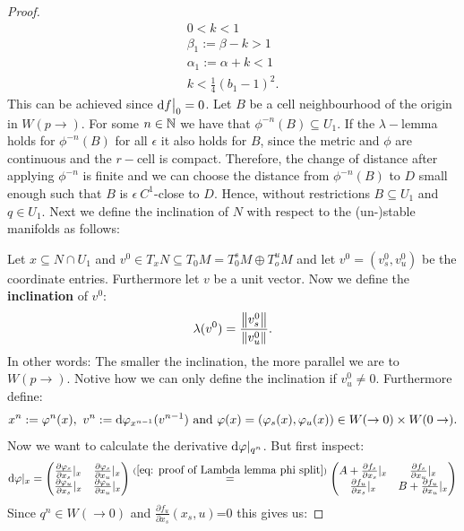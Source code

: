 \begin{proof}
		
		\begin{gather*}
			0<k<1 \\
			\beta_1:=\beta -k >1 \\
			\alpha_1:=\alpha +k <1 \\
			k<\frac{1}{4}(b_1-1)^2.
		\end{gather*}
		This can be achieved since $\mathop{}\!\mathrm{d} f\big|_0=0$.
		Let $B$ be a cell neighbourhood of the origin in $W(p\to )$. For some $n \in \mathbb{N}$ we have that $\phi^{-n}(B)\subseteq U_1$. If the $\lambda-$lemma holds for $\phi^{-n}(B)$ for all $\epsilon$ it also holds for $B$, since the metric and $\phi$ are continuous and the $r-$cell is compact. Therefore, the change of distance after applying $\phi^{-n}$ is finite and we can choose the distance from $\phi^{-n}(B)$ to $D$ small enough such that $B$ is $\epsilon~C^1$-close to $D$. Hence, without restrictions $B\subseteq U_1$ and $q\in U_1$.  Next we define the inclination of $N$ with respect to the (un-)stable manifolds as follows: 
		
		Let $x\subseteq N \cap U_1$ and $v^0\in T_xN\subseteq T_0M=T^s_0M \oplus T^u_oM$ and let $v^0=(v_s^0,v_u^0)$ be the coordinate entries. Furthermore let $v$ be a unit vector. Now we define the \textbf{inclination} of $v^0$:
		\begin{align*}
			\lambda(v^0)=\frac{\left\lVert v^0_s\right\rVert}{\left\lVert v^0_u\right\rVert}.
		\end{align*}
		In other words: The smaller the inclination, the more parallel we are to $W(p\to)$. Notive how we can only define the inclination if $v^0_u\neq 0$. 
		Furthermore define:
		\begin{align*} x^n:=\varphi^n(x), ~v^n:= \mathop{}\!\mathrm{d} \varphi_{x^{n-1}}(v^{n-1}) \text{ and } \varphi(x)=(\varphi_s(x),\varphi_u(x))\in W(\to 0)\times W(0\to).
		\end{align*}
		Now we want to calculate the derivative $\mathop{}\!\mathrm{d} \varphi|_{q^n}$. But first inspect:
		\begin{align*}
			\mathop{}\!\mathrm{d} \varphi|_x=\begin{pmatrix}
				\frac{\partial \varphi_s}{\partial x_s}|_{x} & \frac{\partial \varphi_s}{\partial x_u} |_{x}\\
				\frac{\partial \varphi_u}{\partial x_s} |_{x}& \frac{\partial \varphi_u}{\partial x_u}|_{x}
			\end{pmatrix}\overset{(\ref{eq: proof of Lambda lemma phi split}) }{~=~}
			\begin{pmatrix}
				A+ \frac{\partial f_s}{\partial x_s}|_{x}& \frac{\partial f_s}{\partial x_u}|_{x}\\
				\frac{\partial f_u}{\partial x_s} |_{x} & B+ \frac{\partial f_u}{\partial x_u}|_{x}
			\end{pmatrix} 
		\end{align*} Since $q^n\in W(\to 0)$ and $\frac{\partial f_u}{\partial x_s}(x_s,u)$=0 this gives us:
		

\end{proof}
